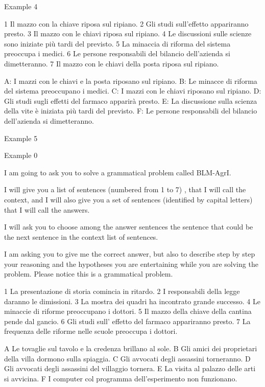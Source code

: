 Example 4

1 Il mazzo con la chiave riposa sul ripiano.
2 Gli studi sull'effetto appariranno presto.
3 Il mazzo con le chiavi riposa sul ripiano.
4 Le discussioni sulle scienze sono iniziate più tardi del previsto.
5 La minaccia di riforma del sistema preoccupa i medici.
6 Le persone responsabili del bilancio dell'azienda si dimetteranno.
7 Il mazzo con le chiavi della posta riposa sul ripiano.


A: I mazzi con le chiavi e la posta riposano sul  ripiano.
B: Le minacce di riforma del sistema preoccupano i medici.
C: I mazzi con le chiavi riposano sul ripiano.
D: Gli studi sugli effetti del farmaco apparirà presto.
E: La discussione sulla scienza della vite è iniziata più tardi del previsto.
F: Le persone responsabili del bilancio dell'azienda si dimetteranno.

Example 5


Example 0

I am going to ask you to solve a grammatical problem called BLM-AgrI.  

I will give you a list of sentences (numbered from 1 to 7) , that I will call the context, and I will also give you a set of sentences (identified by capital letters) that I will call  the answers. 

I will ask you to choose among the answer sentences the sentence that could be the next sentence in the context list of sentences.

I am asking you to give me the correct answer, but also to describe step by step  your reasoning and the hypotheses you are entertaining while you are solving the problem. Please notice this is a grammatical problem.



1  La presentazione di storia comincia in ritardo.
2  I responsabili della legge daranno le dimissioni.
3  La mostra dei quadri ha incontrato grande successo.
4  Le minaccie di riforme preoccupano i dottori.
5  Il mazzo della chiave della cantina pende dal gancio.
6  Gli studi sull' effetto del farmaco appariranno presto.
7  La frequenza delle riforme nelle scuole preoccupa i dottori.


A  Le tovaglie sul tavolo e la credenza brillano al sole.
B  Gli amici dei proprietari della villa dormono sulla spiaggia.
C  Gli avvocati degli assassini torneranno.
D  Gli avvocati degli assassini del villaggio tornera.
E  La visita al palazzo delle arti si avvicina.
F  I computer col programma dell'esperimento non funzionano.

